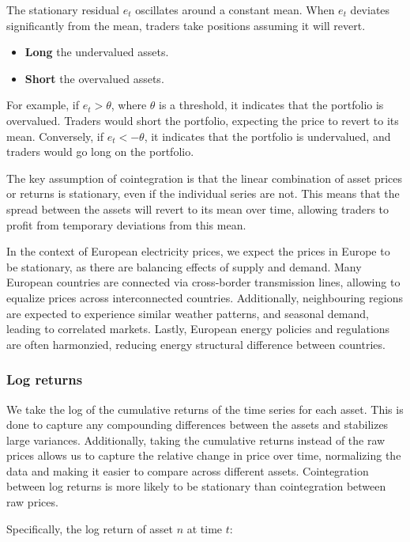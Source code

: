 \documentclass[12pt]{article}
\begin{document}
The stationary residual $e_t$ oscillates around a constant mean. When $e_t$ deviates significantly from the mean, traders take positions assuming it will revert.
\begin{itemize}
  \item \textbf{Long} the undervalued assets.
  \item \textbf{Short} the overvalued assets.
\end{itemize}

For example, if $e_t > \theta$, where $\theta$ is a threshold, it indicates that the portfolio is overvalued. Traders would short the portfolio, expecting the price to revert to its mean. Conversely, if $e_t < -\theta$, it indicates that the portfolio is undervalued, and traders would go long on the portfolio.

The key assumption of cointegration is that the linear combination of asset prices or returns is stationary, even if the individual series are not. This means that the spread between the assets will revert to its mean over time, allowing traders to profit from temporary deviations from this mean.

In the context of European electricity prices, we expect the prices in Europe to be stationary, as there are balancing effects of supply and demand. Many European countries are connected via cross-border transmission lines, allowing to equalize prices across interconnected countries. Additionally, neighbouring regions are expected to experience similar weather patterns, and seasonal demand, leading to correlated markets. Lastly, European energy policies and regulations are often harmonzied, reducing energy structural difference between countries.

\subsubsection{Log returns}

We take the log of the cumulative returns of the time series for each asset. This is done to capture any compounding differences between the assets and stabilizes large variances. Additionally, taking the cumulative returns instead of the raw prices allows us to capture the relative change in price over time, normalizing the data and making it easier to compare across different assets. Cointegration between log returns is more likely to be stationary than cointegration between raw prices.

Specifically, the log return of asset $n$ at time $t$:
\end{document}
